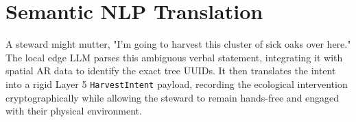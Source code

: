 \section{Semantic NLP Translation}
A steward might mutter, "I'm going to harvest this cluster of sick oaks over here." The local edge LLM parses this ambiguous verbal statement, integrating it with spatial AR data to identify the exact tree UUIDs. It then translates the intent into a rigid Layer 5 \texttt{HarvestIntent} payload, recording the ecological intervention cryptographically while allowing the steward to remain hands-free and engaged with their physical environment.

